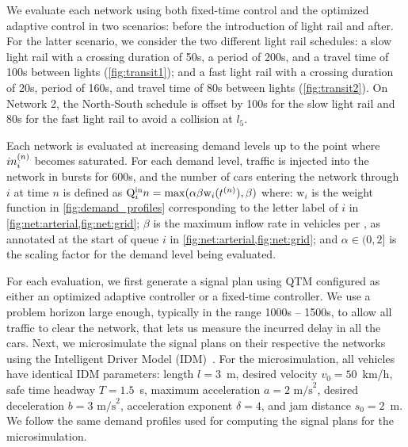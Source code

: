 We evaluate each network using both fixed-time control and the optimized
adaptive control in two scenarios: before the introduction of light rail and
after.
%
For the latter scenario, we consider the two different light rail schedules:
%
a slow light rail with a crossing duration of 50s, a period of 200s, and a
travel time of 100s between lights (\cref{fig:transit1});
%
and a fast light rail with a crossing duration of 20s, period of 160s, and
travel time of 80s between lights (\cref{fig:transit2}).
%
On Network 2, the North-South schedule is offset by 100s for the slow light rail
and 80s for the fast light rail to avoid a collision at $l_5$.


%
%
Each network is evaluated at increasing demand levels up to the point where
$\inq{i}$ becomes saturated.
%
%
For each demand level, traffic is injected into the network in bursts for 600s,
and the number of cars entering the network through $i$ at time $n$ is defined
as $\QIN{i}{n} = \mathrm{max}(\alpha \beta \mathrm{w}_i(\tn[n]),\beta)$ where:
%
$\mathrm{w}_i$ is the weight function in \cref{fig:demand_profiles}
corresponding to the letter label of $i$ in \cref{fig:net:arterial,fig:net:grid};
%
$\beta$ is the maximum inflow rate in vehicles per \DT, as annotated at the
start of queue $i$ in \cref{fig:net:arterial,fig:net:grid}; and
%
$\alpha \in (0,2]$ is the scaling factor for the demand level being evaluated.


For each evaluation, we first generate a signal plan using QTM configured as
either an optimized adaptive controller or a fixed-time controller.
%
We use a problem horizon \TMAX large enough, typically in the range 1000s --
1500s, to allow all traffic to clear the network, that lets us measure the
incurred delay in all the cars.
%
Next, we microsimulate the signal plans on their respective the networks using
the Intelligent Driver Model (IDM)~\cite{treiber2000congested}.
%
For the microsimulation, all vehicles have identical IDM parameters: length
$l=3$~m, desired velocity $v_0 = 50$~km/h, safe time headway $T=1.5$~s, maximum
acceleration $a=2 \text{ m/s}^2$, desired deceleration $b = 3 \text{ m/s}^2$,
acceleration exponent $\delta = 4$, and jam distance $s_0 = 2$~m.
%
We follow the same demand profiles used for computing the signal plans for the
microsimulation.


